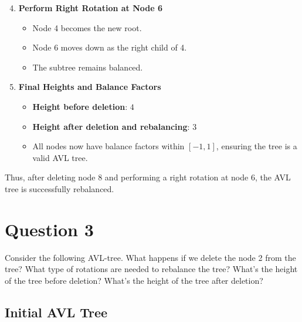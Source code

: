 \documentclass[12pt]{article}
\begin{document}
\begin{enumerate}
    \setcounter{enumi}{3} %
    \item \textbf{Perform Right Rotation at Node 6}
    \begin{itemize}
        \item Node 4 becomes the new root.
        \item Node 6 moves down as the right child of 4.
        \item The subtree remains balanced.
    \end{itemize}

    \item \textbf{Final Heights and Balance Factors}
    \begin{itemize}
        \item \textbf{Height before deletion}: \(4\)
        \item \textbf{Height after deletion and rebalancing}: \(3\)
        \item All nodes now have balance factors within \([-1,1]\), ensuring the tree is a valid AVL tree.
    \end{itemize}
\end{enumerate}

Thus, after deleting node 8 and performing a right rotation at node 6, the AVL tree is successfully rebalanced.
\pagebreak

\section*{Question 3}
Consider the following AVL-tree. What happens if we delete the node 2 from the tree? What type of rotations are needed to rebalance the tree? What’s the height of the tree before deletion? What’s the height of the tree after deletion?

\subsection*{Initial AVL Tree}
\begin{center}
\end{center}
\end{document}
